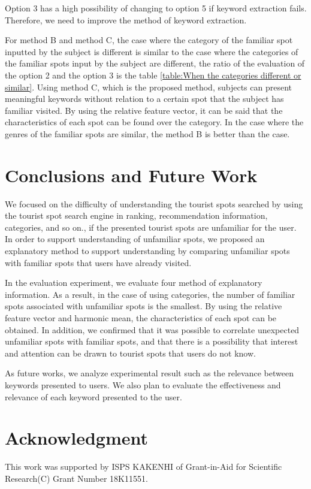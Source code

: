 \documentclass[journal]{IAENGtran}
\begin{document}
Option 3 has a high possibility of changing to option 5 if keyword extraction fails. Therefore, we need to improve the method of keyword extraction.

For method B and method C, the case where the category of the familiar spot inputted by the subject is different is similar to the case where the categories of the familiar spots input by the subject are different, the ratio of the evaluation of the option 2 and the option 3 is the table \ref{table:When the categories different or similar}.
Using method C, which is the proposed method, subjects can present meaningful keywords without relation to a certain spot that the subject has familiar visited.
By using the relative feature vector, it can be said that the characteristics of each spot can be found over the category.
In the case where the genres of the familiar spots are similar, the method B is better than the case.

\section{Conclusions and Future Work}
\label{sec:Conclusions and Future Work}
We focused on the difficulty of understanding the tourist spots searched by using the tourist spot search engine in ranking, recommendation information, categories, and so on., if the presented tourist spots are unfamiliar for the user.
In order to support understanding of unfamiliar spots, we proposed an explanatory method to support understanding by comparing unfamiliar spots with familiar spots that users have already visited.

In the evaluation experiment, we evaluate four method of explanatory information.
As a result, in the case of using categories, the number of familiar spots associated with unfamiliar spots is the smallest.
By using the relative feature vector and harmonic mean, the characteristics of each spot can be obtained.
In addition, we confirmed that it was possible to correlate unexpected unfamiliar spots with familiar spots, and that there is a possibility that interest and attention can be drawn to tourist spots that users do not know.

As future works, we analyze experimental result such as the relevance between keywords presented to users.
We also plan to evaluate the effectiveness and relevance of each keyword presented to the user.

\section*{Acknowledgment}
This work was supported by ISPS KAKENHI of Grant-in-Aid for Scientific Research(C) Grant Number 18K11551.
\end{document}
